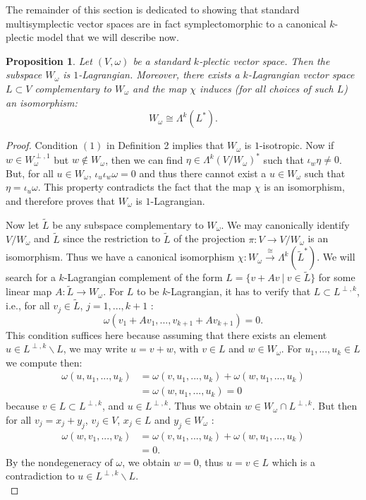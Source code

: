 \documentclass[a4paper,12pt,leqno]{article}
\newtheorem{prop}{Proposition}
\begin{document}
The remainder of this section is dedicated to showing that standard multisymplectic vector spaces are in fact symplectomorphic to a 
canonical $k$-plectic model that we will describe now. 


\begin{prop}
Let $(V,\omega)$ be a standard $k$-plectic vector space. Then the subspace $W_{\omega}$ is $1$-Lagrangian. Moreover, there 
exists a $k$-Lagrangian vector space $L\subset V$ complementary to $W_{\omega}$ and the map $\chi$ induces (for all choices 
of such $L$) an isomorphism:
\begin{equation*}
W_{\omega}\cong \Lambda^k(L^*). 
\end{equation*}
\end{prop}

\begin{proof}

Condition $(1)$ in Definition 2 implies that $W_{\omega}$ is $1$-isotropic. Now if $w\in W_{\omega}^{\perp,1}$ but 
$w\notin W_{\omega}$, then we can find $\eta\in \Lambda^k(V/W_{\omega})^*$ such that $\iota_w\eta\ne0$. 
But, for all $u\in W_{\omega}$, $\iota_u\iota_w\omega=0$ and thus there cannot exist a $u\in W_{\omega}$ such 
that $\eta=\iota_u\omega$. This property contradicts the fact that the map $\chi$ is an isomorphism, and therefore
proves that $W_{\omega}$ is $1$-Lagrangian.  


Now let $\widetilde{L}$ be any subspace complementary to $W_{\omega}$. We may canonically identify $V/W_{\omega}$ and 
$\widetilde{L}$ since the restriction to $\widetilde{L}$ of the projection $\pi:V\rightarrow V/W_{\omega}$ is an isomorphism. Thus 
we have a canonical isomorphism $\chi:W_{\omega}\stackrel{\cong}{\longrightarrow} \Lambda^k(\widetilde{L}^*)$. We will search 
for a $k$-Lagrangian complement of the form $L=\{v+Av \ | \ v\in \widetilde{L}\}$ for some linear map 
$A:\widetilde{L}\rightarrow W_{\omega}$. For $L$ to be $k$-Lagrangian, it has to verify that $L\subset L^{\perp,k}$, i.e.,
for all $v_j\in \widetilde{L}$, $j=1,...,k{+}1$ :
\begin{equation*}
\omega(v_1+A v_1,...,v_{k+1}+A v_{k+1})=0.
\end{equation*}
This condition suffices here because assuming that there exists an element $u\in L^{\perp,k} \backslash L$, we may write 
$u=v+w$, with $v\in L$ and $w\in W_{\omega}$. For $u_1,...,u_k\in L$ we compute then:
\begin{align*}
\omega(u,u_1,...,u_k)&=\omega(v,u_1,...,u_k)+\omega(w,u_1,...,u_k) \\
&=\omega(w,u_1,...,u_k)=0
\end{align*}
because $v\in  L\subset L^{\perp,k}$, and $u\in L^{\perp,k}$. Thus we obtain $w\in W_{\omega}\cap L^{\perp,k}$. But then for 
all $v_j=x_j+y_j$, $v_j\in V$, $x_j\in L$ and $y_j\in W_{\omega}$ :
\begin{align*}
\omega(w,v_1,...,v_k)&=\omega(v,u_1,...,u_k)+\omega(w,u_1,...,u_k) \\
&=0.
\end{align*}
By the nondegeneracy of $\omega$, we obtain $w=0$, thus $u=v\in L$ which is a contradiction to $u\in L^{\perp,k} \backslash L$.\\ 


\end{proof}
\end{document}
